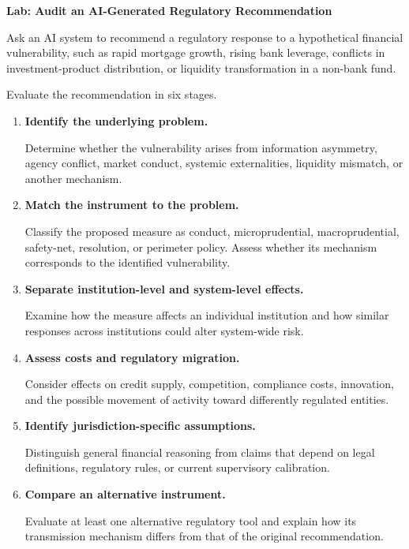 

\textbf{Lab: Audit an AI-Generated Regulatory Recommendation}

Ask an AI system to recommend a regulatory response to a hypothetical financial vulnerability, such as rapid mortgage growth, rising bank leverage, conflicts in investment-product distribution, or liquidity transformation in a non-bank fund.

Evaluate the recommendation in six stages.

\begin{enumerate}

\item \textbf{Identify the underlying problem.}

Determine whether the vulnerability arises from information asymmetry, agency conflict, market conduct, systemic externalities, liquidity mismatch, or another mechanism.

\item \textbf{Match the instrument to the problem.}

Classify the proposed measure as conduct, microprudential, macroprudential, safety-net, resolution, or perimeter policy. Assess whether its mechanism corresponds to the identified vulnerability.

\item \textbf{Separate institution-level and system-level effects.}

Examine how the measure affects an individual institution and how similar responses across institutions could alter system-wide risk.

\item \textbf{Assess costs and regulatory migration.}

Consider effects on credit supply, competition, compliance costs, innovation, and the possible movement of activity toward differently regulated entities.

\item \textbf{Identify jurisdiction-specific assumptions.}

Distinguish general financial reasoning from claims that depend on legal definitions, regulatory rules, or current supervisory calibration.

\item \textbf{Compare an alternative instrument.}

Evaluate at least one alternative regulatory tool and explain how its transmission mechanism differs from that of the original recommendation.

\end{enumerate}

